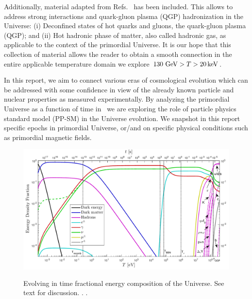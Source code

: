 Additionally, material adapted from Refs.~\cite{Letessier:2002ony,Rafelski:2015cxa,Rafelski:2016hnq,Rafelski:2019twp} has been included. This allows to address strong interactions and quark-gluon plasma (QGP) hadronization in the Universe: (i) Deconfined states of hot quarks and gluons, the quark-gluon plasma (QGP); and (ii) Hot hadronic phase of matter, also called hadronic gas, as applicable to the context of the primordial Universe. It is our hope that this collection of material allows the reader to obtain a smooth connection in the entire applicable temperature domain we explore $130\text{ GeV}>T>20\,\mathrm{keV}$.

In this report, we aim to connect various eras of cosmological evolution which can be addressed with some confidence in view of the already known particle and nuclear properties as measured experimentally. By analyzing the primordial Universe as a function of time in~ we are exploring the role of particle physics standard model (PP-SM) in the Universe evolution. We snapshot in this report specific epochs in primordial Universe, or/and on specific physical conditions such as primordial magnetic fields.

\begin{figure}
\vspace*{0.62\linewidth}\includegraphics[width=\linewidth]{01-introduction/Figures/energyFractions.pdf}\label{fig:energy:frac}
\caption{Evolving in time fractional energy composition of the Universe.  See text for discussion. . .}
 \end{figure}

